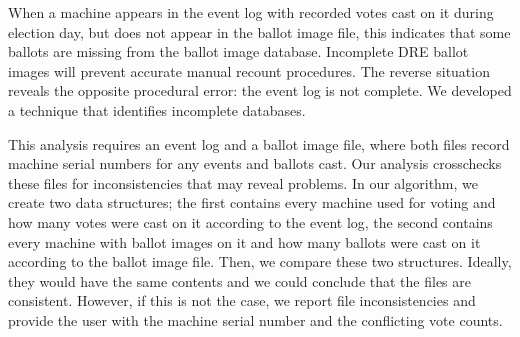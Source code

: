 When a machine
appears in the event log with recorded votes cast on it during
election day, but does not appear in the ballot image file, this
indicates that some ballots are missing from the ballot image
database. Incomplete DRE ballot images will prevent accurate manual
recount procedures. The reverse situation reveals the opposite
procedural error: the event log is not complete.  We developed a
technique that identifies incomplete databases.   

This analysis requires an event log and a ballot image file, where
both files record machine serial numbers for any events and ballots
cast.  Our analysis crosschecks these files for inconsistencies that
may reveal problems.  In our algorithm, we create two data structures;
the first contains every machine used for voting and how many votes
were cast on it according to the event log, the second contains every
machine with ballot images on it and how many ballots were cast on it
according to the ballot image file.  Then, we compare these two
structures.  Ideally, they would have the same contents and we could
conclude that the files are consistent.  However, if this is not the case, we
report file 
inconsistencies and provide the user with the machine serial number
and the conflicting vote counts.      
